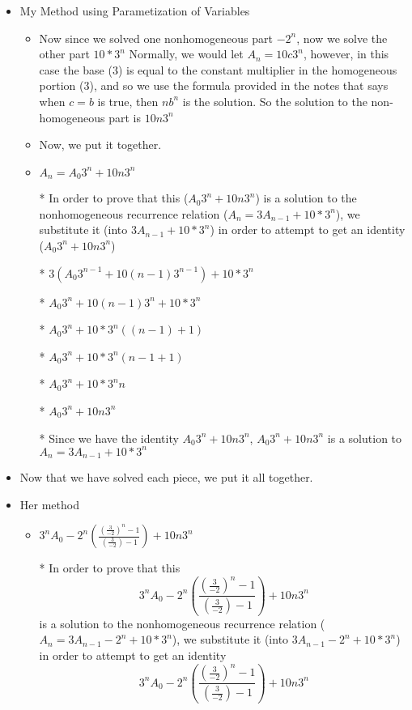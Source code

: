 \begin{enumerate}
\begin{enumerate}
\begin{itemize}
\begin{itemize}
      \end{itemize} %
    \item My Method using Parametization of Variables
      \begin{itemize} %
      \item Now since we solved one nonhomogeneous part $-2^{n}$, now we solve the other part $10*3^{n}$ Normally, we would let $A_{n}=10c3^{n}$, however, in this case the base ($3$) is equal to the constant multiplier in the homogeneous portion ($3$), and so we use the formula provided in the notes that says when $c=b$ is true, then $nb^{n}$ is the solution. So the solution to the non-homogeneous part is $10n3^{n}$
      \item Now, we put it together.
      \item $A_{n}=A_{0}3^{n}+10n3^{n}$
      \item [*] In order to prove that this ($A_{0}3^{n}+10n3^{n}$) is a solution to the nonhomogeneous recurrence relation ($A_{n}=3A_{n-1}+10*3^{n}$), we substitute it (into $3A_{n-1}+10*3^{n}$) in order to attempt to get an identity ($A_{0}3^{n}+10n3^{n}$)
      \item [*] $3(A_{0}3^{n-1}+10(n-1)3^{n-1})+10*3^{n}$
      \item [*] $A_{0}3^{n}+10(n-1)3^{n}+10*3^{n}$
      \item [*] $A_{0}3^{n}+10*3^{n}((n-1)+1)$
      \item [*] $A_{0}3^{n}+10*3^{n}(n-1+1)$
      \item [*] $A_{0}3^{n}+10*3^{n}n$
      \item [*] $A_{0}3^{n}+10n3^{n}$
      \item [*] Since we have the identity $A_{0}3^{n}+10n3^{n}$, $A_{0}3^{n}+10n3^{n}$ is a solution to $A_{n}=3A_{n-1}+10*3^{n}$
      \end{itemize} %
    \item Now that we have solved each piece, we put it all together.
    \item Her method
      \begin{itemize} %
      \item $3^{n}A_{0} -2^{n}\left(\frac{\left(\frac{3}{-2}\right)^{n}-1}{\left(\frac{3}{-2}\right)-1}\right) +10n3^{n}$
      \item [*] In order to prove that this $$3^{n}A_{0} -2^{n}\left(\frac{\left(\frac{3}{-2}\right)^{n}-1}{\left(\frac{3}{-2}\right)-1}\right) +10n3^{n}$$ is a solution to the nonhomogeneous recurrence relation ($A_{n}=3A_{n-1}-2^{n}+10*3^{n}$), we substitute it (into $3A_{n-1}-2^{n}+10*3^{n}$) in order to attempt to get an identity $$3^{n}A_{0} -2^{n}\left(\frac{\left(\frac{3}{-2}\right)^{n}-1}{\left(\frac{3}{-2}\right)-1}\right) +10n3^{n}$$

\end{itemize}
\end{itemize}
\end{enumerate}
\end{enumerate}
